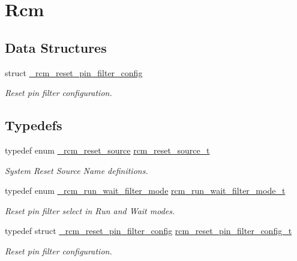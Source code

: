 \hypertarget{group__rcm}{}\section{Rcm}
\label{group__rcm}
\subsection*{Data Structures}
\begin{DoxyCompactItemize}
\item 
struct \mbox{\hyperlink{struct__rcm__reset__pin__filter__config}{\+\_\+rcm\+\_\+reset\+\_\+pin\+\_\+filter\+\_\+config}}
\begin{DoxyCompactList}\small\item\em Reset pin filter configuration. \end{DoxyCompactList}\end{DoxyCompactItemize}
\subsection*{Typedefs}
\begin{DoxyCompactItemize}
\item 
\mbox{\label{group__rcm_ga3846d327a8556045a76cea7143317ddb}} 
typedef enum \mbox{\hyperlink{group__rcm_ga089aeb2329dd1c555a9a7493f3efff6a}{\+\_\+rcm\+\_\+reset\+\_\+source}} \mbox{\hyperlink{group__rcm_ga3846d327a8556045a76cea7143317ddb}{rcm\+\_\+reset\+\_\+source\+\_\+t}}
\begin{DoxyCompactList}\small\item\em System Reset Source Name definitions. \end{DoxyCompactList}\item 
\mbox{\label{group__rcm_gab04818291759684817621ea4afa2466d}} 
typedef enum \mbox{\hyperlink{group__rcm_ga1e89ca2ffc3856208be42ca30c191b4d}{\+\_\+rcm\+\_\+run\+\_\+wait\+\_\+filter\+\_\+mode}} \mbox{\hyperlink{group__rcm_gab04818291759684817621ea4afa2466d}{rcm\+\_\+run\+\_\+wait\+\_\+filter\+\_\+mode\+\_\+t}}
\begin{DoxyCompactList}\small\item\em Reset pin filter select in Run and Wait modes. \end{DoxyCompactList}\item 
\mbox{\label{group__rcm_ga1ff478888c7dd7c6ed8ff27f8fb00f59}} 
typedef struct \mbox{\hyperlink{struct__rcm__reset__pin__filter__config}{\+\_\+rcm\+\_\+reset\+\_\+pin\+\_\+filter\+\_\+config}} \mbox{\hyperlink{group__rcm_ga1ff478888c7dd7c6ed8ff27f8fb00f59}{rcm\+\_\+reset\+\_\+pin\+\_\+filter\+\_\+config\+\_\+t}}
\begin{DoxyCompactList}\small\item\em Reset pin filter configuration. \end{DoxyCompactList}\end{DoxyCompactItemize}
